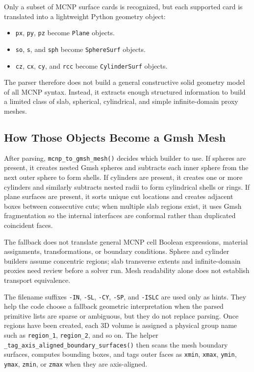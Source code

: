\documentclass[11pt]{article}
\begin{document}
Only a subset of MCNP surface cards is recognized, but each supported card is translated into a lightweight Python geometry object:
\begin{itemize}
\item \texttt{px}, \texttt{py}, \texttt{pz} become \texttt{Plane} objects.
\item \texttt{so}, \texttt{s}, and \texttt{sph} become \texttt{SphereSurf} objects.
\item \texttt{cz}, \texttt{cx}, \texttt{cy}, and \texttt{rcc} become \texttt{CylinderSurf} objects.
\end{itemize}
The parser therefore does not build a general constructive solid geometry model of all MCNP syntax. Instead, it extracts enough structured information to build a limited class of slab, spherical, cylindrical, and simple infinite-domain proxy meshes.

\subsection*{How Those Objects Become a Gmsh Mesh}
After parsing, \texttt{mcnp\_to\_gmsh\_mesh()} decides which builder to use. If spheres are present, it creates nested Gmsh spheres and subtracts each inner sphere from the next outer sphere to form shells. If cylinders are present, it creates one or more cylinders and similarly subtracts nested radii to form cylindrical shells or rings. If plane surfaces are present, it sorts unique cut locations and creates adjacent boxes between consecutive cuts; when multiple slab regions exist, it uses Gmsh fragmentation so the internal interfaces are conformal rather than duplicated coincident faces.

The fallback does not translate general MCNP cell Boolean expressions, material assignments, transformations, or boundary conditions. Sphere and cylinder builders assume concentric regions; slab transverse extents and infinite-domain proxies need review before a solver run. Mesh readability alone does not establish transport equivalence.

The filename suffixes \texttt{-IN}, \texttt{-SL}, \texttt{-CY}, \texttt{-SP}, and \texttt{-ISLC} are used only as hints. They help the code choose a fallback geometric interpretation when the parsed primitive lists are sparse or ambiguous, but they do not replace parsing. Once regions have been created, each 3D volume is assigned a physical group name such as \texttt{region\_1}, \texttt{region\_2}, and so on. The helper \texttt{\_tag\_axis\_aligned\_boundary\_surfaces()} then scans the mesh boundary surfaces, computes bounding boxes, and tags outer faces as \texttt{xmin}, \texttt{xmax}, \texttt{ymin}, \texttt{ymax}, \texttt{zmin}, or \texttt{zmax} when they are axis-aligned.
\end{document}
